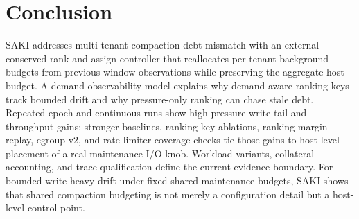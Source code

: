 \section{Conclusion}

SAKI addresses multi-tenant \rocksdb compaction-debt mismatch with an external
conserved rank-and-assign controller that reallocates per-tenant background
budgets from previous-window observations while preserving the aggregate host
budget. A demand-observability model explains why demand-aware ranking keys
track bounded drift and why pressure-only ranking can chase stale debt.
Repeated epoch and continuous runs show
high-pressure write-tail and throughput gains; stronger baselines, ranking-key
ablations, ranking-margin replay, cgroup-v2, and rate-limiter coverage checks
tie those gains to host-level placement of a real maintenance-I/O knob.
Workload variants, collateral accounting, and trace qualification define the
current evidence boundary. For bounded write-heavy drift under fixed shared
maintenance budgets, SAKI shows that shared compaction budgeting is not merely
a configuration detail but a host-level control point.
